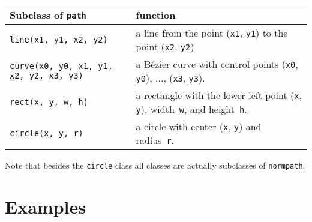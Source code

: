 \medskip
\begin{tabularx}{\linewidth}{l>{\raggedright\arraybackslash}X}
Subclass of \texttt{path} & function \\
\hline
\texttt{line(x1, y1, x2, y2)} & a line from the point
  (\texttt{x1}, \texttt{y1}) to the point (\texttt{x2}, \texttt{y2})\\
\texttt{curve(x0, y0, x1, y1, x2, y2, x3, y3)} & a B\'ezier curve with 
control points  (\texttt{x0}, \texttt{y0}), $\dots$, (\texttt{x3}, \texttt{y3}).\\
\texttt{rect(x, y, w, h)} &  a rectangle with the
  lower left point (\texttt{x}, \texttt{y}), width~\texttt{w}, and
  height~\texttt{h}. \\
\texttt{circle(x, y, r)} & a circle with 
  center (\texttt{x}, \texttt{y}) and radius~\texttt{r}.
\end{tabularx}
\medskip
Note that besides the \verb|circle| class all classes are actually
subclasses of \verb|normpath|.


\section{Examples}



